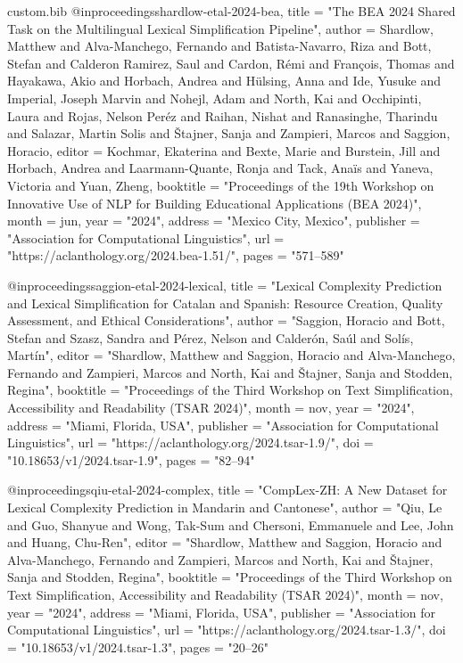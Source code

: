 \begin{filecontents*}[overwrite]{custom.bib}
@inproceedings{shardlow-etal-2024-bea,
    title = "The {BEA} 2024 Shared Task on the Multilingual Lexical Simplification Pipeline",
    author = {Shardlow, Matthew  and
      Alva-Manchego, Fernando  and
      Batista-Navarro, Riza  and
      Bott, Stefan  and
      Calderon Ramirez, Saul  and
      Cardon, R{\'e}mi  and
      Fran{\c{c}}ois, Thomas  and
      Hayakawa, Akio  and
      Horbach, Andrea  and
      H{\"u}lsing, Anna  and
      Ide, Yusuke  and
      Imperial, Joseph Marvin  and
      Nohejl, Adam  and
      North, Kai  and
      Occhipinti, Laura  and
      Rojas, Nelson Per{\'e}z  and
      Raihan, Nishat  and
      Ranasinghe, Tharindu  and
      Salazar, Martin Solis  and
      {\v{S}}tajner, Sanja  and
      Zampieri, Marcos  and
      Saggion, Horacio},
    editor = {Kochmar, Ekaterina  and
      Bexte, Marie  and
      Burstein, Jill  and
      Horbach, Andrea  and
      Laarmann-Quante, Ronja  and
      Tack, Ana{\"i}s  and
      Yaneva, Victoria  and
      Yuan, Zheng},
    booktitle = "Proceedings of the 19th Workshop on Innovative Use of NLP for Building Educational Applications (BEA 2024)",
    month = jun,
    year = "2024",
    address = "Mexico City, Mexico",
    publisher = "Association for Computational Linguistics",
    url = "https://aclanthology.org/2024.bea-1.51/",
    pages = "571--589"
}

@inproceedings{saggion-etal-2024-lexical,
    title = "Lexical Complexity Prediction and Lexical Simplification for {C}atalan and {S}panish: Resource Creation, Quality Assessment, and Ethical Considerations",
    author = "Saggion, Horacio  and
      Bott, Stefan  and
      Szasz, Sandra  and
      P{\'e}rez, Nelson  and
      Calder{\'o}n, Sa{\'u}l  and
      Sol{\'i}s, Mart{\'i}n",
    editor = "Shardlow, Matthew  and
      Saggion, Horacio  and
      Alva-Manchego, Fernando  and
      Zampieri, Marcos  and
      North, Kai  and
      {\v{S}}tajner, Sanja  and
      Stodden, Regina",
    booktitle = "Proceedings of the Third Workshop on Text Simplification, Accessibility and Readability (TSAR 2024)",
    month = nov,
    year = "2024",
    address = "Miami, Florida, USA",
    publisher = "Association for Computational Linguistics",
    url = "https://aclanthology.org/2024.tsar-1.9/",
    doi = "10.18653/v1/2024.tsar-1.9",
    pages = "82--94"
}

@inproceedings{qiu-etal-2024-complex,
    title = "{C}omp{L}ex-{ZH}: A New Dataset for Lexical Complexity Prediction in {M}andarin and {C}antonese",
    author = "Qiu, Le  and
      Guo, Shanyue  and
      Wong, Tak-Sum  and
      Chersoni, Emmanuele  and
      Lee, John  and
      Huang, Chu-Ren",
    editor = "Shardlow, Matthew  and
      Saggion, Horacio  and
      Alva-Manchego, Fernando  and
      Zampieri, Marcos  and
      North, Kai  and
      {\v{S}}tajner, Sanja  and
      Stodden, Regina",
    booktitle = "Proceedings of the Third Workshop on Text Simplification, Accessibility and Readability (TSAR 2024)",
    month = nov,
    year = "2024",
    address = "Miami, Florida, USA",
    publisher = "Association for Computational Linguistics",
    url = "https://aclanthology.org/2024.tsar-1.3/",
    doi = "10.18653/v1/2024.tsar-1.3",
    pages = "20--26"
}


\end{filecontents*}
